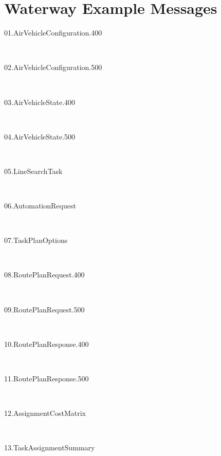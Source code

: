 \chapter{Waterway Example Messages}
\begin{fullwidth}
	
		\begin{multicols*}{2}
\begin{description}
	\item[\hypertarget{msg:01.AirVehicleConfiguration.400}{01.AirVehicleConfiguration.400}]  \hfill \ 
	\item[\hypertarget{msg:02.AirVehicleConfiguration.500}{02.AirVehicleConfiguration.500}]  \hfill \ 
	\item[\hypertarget{msg:03.AirVehicleState.400}{03.AirVehicleState.400}]  \hfill \ 
	\item[\hypertarget{msg:04.AirVehicleState.500}{04.AirVehicleState.500}]  \hfill \ 
	\item[\hypertarget{msg:05.LineSearchTask}{05.LineSearchTask}]  \hfill \ 
	\item[\hypertarget{msg:06.AutomationRequest}{06.AutomationRequest}]  \hfill \ 
	\item[\hypertarget{msg:07.TaskPlanOptions}{07.TaskPlanOptions}]  \hfill \ 
	\item[\hypertarget{msg:08.RoutePlanRequest.400}{08.RoutePlanRequest.400}]  \hfill \ 
	\item[\hypertarget{msg:09.RoutePlanRequest.500}{09.RoutePlanRequest.500}]  \hfill \ 
	\item[\hypertarget{msg:10.RoutePlanResponse.400}{10.RoutePlanResponse.400}]  \hfill \ 
	\item[\hypertarget{msg:11.RoutePlanResponse.500}{11.RoutePlanResponse.500}]  \hfill \ 
	\item[\hypertarget{msg:12.AssignmentCostMatrix}{12.AssignmentCostMatrix}]  \hfill \ 
	\item[\hypertarget{msg:13.TaskAssignmentSummary}{13.TaskAssignmentSummary}]  \hfill \ 

\end{description}
\end{multicols*}
\end{fullwidth}
